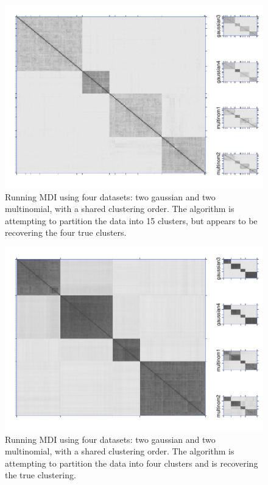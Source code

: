 \documentclass[10pt,a4paper]{article}
\begin{document}
\begin{landscape}
\begin{figure}[htbp]
\label{fig:multinom1}
\includegraphics[width = 0.95\linewidth]{Plots/multinom_consensus.pdf}
\caption{Running MDI using four datasets: two gaussian and two multinomial, with a shared clustering order. The algorithm is attempting to partition the data into 15 clusters, but appears to be recovering the four true clusters.}
\end{figure}
\newpage
\begin{figure}[htbp]
\label{fig:multinom2}
\includegraphics[width = 0.95\linewidth]{Plots/multinom_consensus_4.pdf}
\caption{Running MDI using four datasets: two gaussian and two multinomial, with a shared clustering order. The algorithm is attempting to partition the data into four clusters and is recovering the true clustering.}
\end{figure}


\end{landscape}
\end{document}
